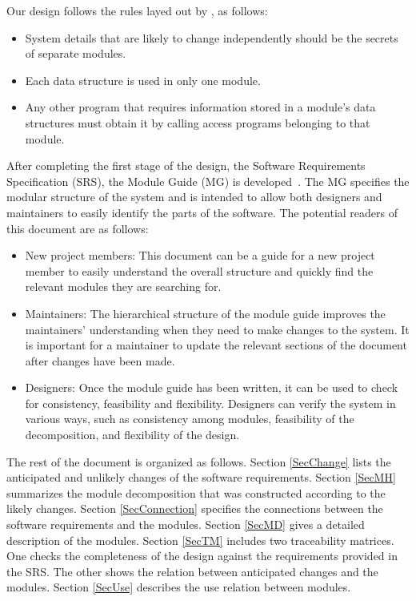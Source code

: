 \documentclass[12pt, titlepage]{article}
\begin{document}
Our design follows the rules layed out by \citet{ParnasEtAl1984}, as follows:
\begin{itemize}
\item System details that are likely to change independently should be the
  secrets of separate modules.
\item Each data structure is used in only one module.
\item Any other program that requires information stored in a module's data
  structures must obtain it by calling access programs belonging to that module.
\end{itemize}

After completing the first stage of the design, the Software Requirements
Specification (SRS), the Module Guide (MG) is developed~\citep{ParnasEtAl1984}. The MG
specifies the modular structure of the system and is intended to allow both
designers and maintainers to easily identify the parts of the software.  The
potential readers of this document are as follows:

\begin{itemize}
\item New project members: This document can be a guide for a new project member
  to easily understand the overall structure and quickly find the
  relevant modules they are searching for.
\item Maintainers: The hierarchical structure of the module guide improves the
  maintainers' understanding when they need to make changes to the system. It is
  important for a maintainer to update the relevant sections of the document
  after changes have been made.
\item Designers: Once the module guide has been written, it can be used to
  check for consistency, feasibility and flexibility. Designers can verify the
  system in various ways, such as consistency among modules, feasibility of the
  decomposition, and flexibility of the design.
\end{itemize}

The rest of the document is organized as follows. Section
\ref{SecChange} lists the anticipated and unlikely changes of the software
requirements. Section \ref{SecMH} summarizes the module decomposition that
was constructed according to the likely changes. Section \ref{SecConnection}
specifies the connections between the software requirements and the
modules. Section \ref{SecMD} gives a detailed description of the
modules. Section \ref{SecTM} includes two traceability matrices. One checks
the completeness of the design against the requirements provided in the SRS. The
other shows the relation between anticipated changes and the modules. Section
\ref{SecUse} describes the use relation between modules.
\end{document}
